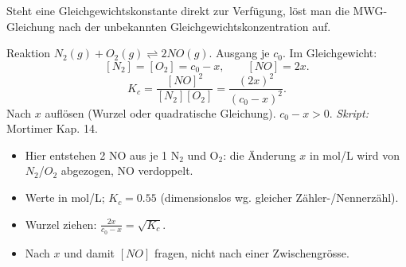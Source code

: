 

Steht eine Gleichgewichtskonstante direkt zur Verfügung, löst man die
MWG-Gleichung nach der unbekannten Gleichgewichtskonzentration auf.

\begin{werkzeugkasten}
Reaktion $N_2(g) + O_2(g) \rightleftharpoons 2NO(g)$.
Ausgang je $c_0$. Im Gleichgewicht:
\[
  [N_2]=[O_2] = c_0 - x,\qquad [NO]=2x .
\]
\[
  K_c = \frac{[NO]^2}{[N_2][O_2]}
      = \frac{(2x)^2}{(c_0-x)^2} .
\]
Nach $x$ auflösen (Wurzel oder quadratische Gleichung). $c_0 - x > 0$.
\textit{Skript:} Mortimer Kap. 14.
\end{werkzeugkasten}

\begin{achtung}
\begin{itemize}
  \item Hier entstehen 2 NO aus je 1 N$_2$ und O$_2$: die Änderung $x$ in
        mol/L wird von $N_2$/$O_2$ abgezogen, NO verdoppelt.
  \item Werte in mol/L; $K_c = 0.55$ (dimensionslos wg. gleicher
        Zähler-/Nennerzähl).
  \item Wurzel ziehen: $\frac{2x}{c_0-x} = \sqrt{K_c}$.
  \item Nach $x$ und damit $[NO]$ fragen, nicht nach einer Zwischengrösse.
\end{itemize}
\end{achtung}
